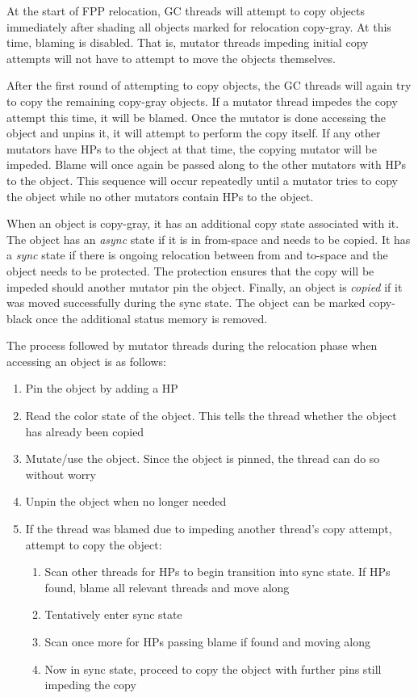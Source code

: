 \documentclass{sig-alternate}
\begin{document}
At the start of FPP relocation, GC threads will attempt to copy
objects immediately after shading all objects marked for relocation
copy-gray. At this time, blaming is disabled. That is, mutator threads
impeding initial copy attempts will not have to attempt to move the objects
themselves. 

After the first round of attempting to copy objects, the GC threads
will again try to copy the remaining copy-gray objects. If a mutator 
thread impedes the copy attempt this time, it will be blamed. 
Once the mutator is done accessing the
object and unpins it, it will attempt to perform the copy itself. If 
any other mutators have HPs to the object at that time, the copying mutator 
will be impeded. Blame will once again be passed
along to the other mutators with HPs to the object. This sequence will
occur repeatedly until a mutator tries to copy the object while no other
mutators contain HPs to the object. 

When an object is copy-gray, it has an additional copy state associated
with it. The object has an \emph{async} state if it is in from-space
and needs to be copied. It has a \emph{sync} state if there is
ongoing relocation between from and to-space and the object needs to
be protected. The protection ensures that the copy will be impeded 
should another mutator pin the object. 
Finally, an object is \emph{copied} if it was moved
successfully during the sync state. The object can be marked
copy-black once the additional status memory is removed.

The process followed by mutator threads during the relocation phase when 
accessing an object is as follows:
\begin{enumerate}
\item Pin the object by adding a HP
\item Read the color state of the object. This tells the thread whether the object
has already been copied
\item Mutate/use the object. Since the object is pinned, the thread can 
do so without worry
\item Unpin the object when no longer needed
\item If the thread was blamed due to impeding another thread's copy attempt, 
attempt to copy the object:
\begin{enumerate}
\item Scan other threads for HPs to begin transition into sync state. If HPs found,
blame all relevant threads and move along
\item Tentatively enter sync state
\item Scan once more for HPs passing blame if found and moving along
\item Now in sync state, proceed to copy the object with further
pins still impeding the copy
\end{enumerate}
\end{enumerate}
\end{document}
